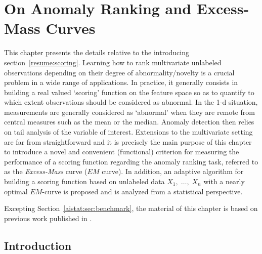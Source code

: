 \chapter{On Anomaly Ranking and Excess-Mass Curves}
\label{aistat:chap}
\begin{chapabstract}
This chapter presents the details relative to the introducing section~\ref{resume:scoring}.
Learning how to rank multivariate unlabeled observations depending on their degree of abnormality/novelty is a crucial problem in a wide range of applications. In practice, it generally consists in building a real valued `scoring' function on the feature space
so as to quantify to which extent observations should be considered as abnormal.
 In the 1-d situation, measurements are generally considered as `abnormal' when they are remote from central measures such as the mean or the median. Anomaly detection then relies on tail
analysis of the variable of interest. Extensions to the multivariate setting are far from straightforward and it is precisely the main purpose of this chapter to introduce a novel and convenient (functional) criterion for measuring the performance of a scoring function regarding the anomaly ranking task, referred to as the \textit{Excess-Mass} curve ($EM$
curve). In addition, an adaptive algorithm for building a scoring function based on unlabeled data $X_1,\; \ldots,\; X_n$ with a nearly optimal $EM$-curve is proposed and is analyzed from a statistical perspective.

Excepting Section~\ref{aistat:sec:benchmark}, the material of this chapter is based on previous work published in \cite{AISTAT15}.
\end{chapabstract}



\section{Introduction}

